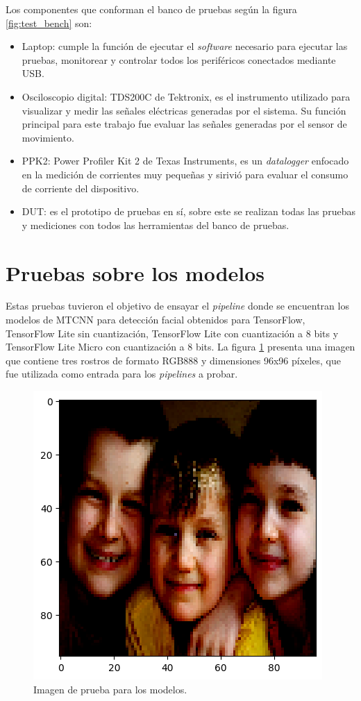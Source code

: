Los componentes que conforman el banco de pruebas según la figura \ref{fig:test_bench} son:
\begin{itemize}
	\item Laptop: cumple la función de ejecutar el \textit{software} necesario para ejecutar las pruebas, monitorear y controlar todos los periféricos conectados mediante USB.
	\item Osciloscopio digital: TDS200C de Tektronix, es el instrumento utilizado para visualizar y medir las señales eléctricas generadas por el sistema. Su función principal para este trabajo fue evaluar las señales generadas por el sensor de movimiento.
	\item PPK2: Power Profiler Kit 2 de Texas Instruments, es un \textit{datalogger} enfocado en la medición de corrientes muy pequeñas y sirivió para evaluar el consumo de corriente del dispositivo.
	\item DUT: es el prototipo de pruebas en sí, sobre este se realizan todas las pruebas y mediciones con todos las herramientas del banco de pruebas.
\end{itemize}

\section{Pruebas sobre los modelos}
Estas pruebas tuvieron el objetivo de ensayar el \textit{pipeline} donde se encuentran los modelos de MTCNN para detección facial obtenidos para TensorFlow, TensorFlow Lite sin cuantización, TensorFlow Lite con cuantización a 8 bits y TensorFlow Lite Micro con cuantización a 8 bits. La figura \ref{fig:test_image} presenta una imagen que contiene tres rostros de formato RGB888 y dimensiones 96x96 píxeles, que fue utilizada como entrada para los \textit{pipelines} a probar.

\begin{figure}[h]
	\centering
	\includegraphics[scale=0.75]{./Figures/test_image.png}
	\caption{Imagen de prueba para los modelos.}
	\label{fig:test_image}
\end{figure}

